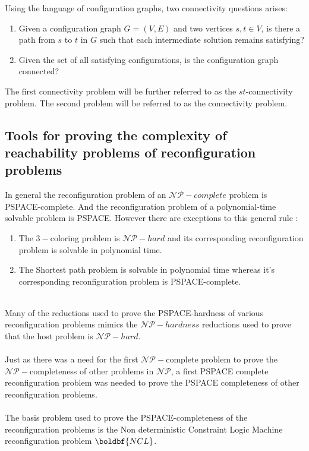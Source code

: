 \begin{defn}Using the language of configuration graphs, two connectivity questions arises: 
\begin{enumerate}
    \item Given a configuration graph $G = (V,E)$ and two vertices $s,t \in V $, is there a path from $s$ to $t$ in $G$ such that each intermediate solution remains satisfying? 
    \item Given the set of all satisfying configurations, is the configuration graph connected? 
\end{enumerate}
The first connectivity problem will be further referred to as the $st$-connectivity problem. The second problem will be referred to as the connectivity problem.
\end{defn}

\subsection{Tools for proving the complexity of reachability problems of reconfiguration problems}
In general the reconfiguration problem of an $\mathcal{NP-}complete$ problem is PSPACE-complete. 
And the reconfiguration problem of a polynomial-time solvable problem is PSPACE. However there are exceptions to this general rule : 
\begin{enumerate}
    \item The $3-$coloring problem is $\mathcal{NP-}hard$ and its corresponding reconfiguration problem is solvable in polynomial time. 
    \item The Shortest path problem is solvable in polynomial time whereas it's corresponding reconfiguration problem is PSPACE-complete.
\end{enumerate}
\\
Many of the reductions used to prove the PSPACE-hardness of various reconfiguration problems mimics the $\mathcal{NP-}hardness$ reductions used to prove that the host problem is $\mathcal{NP-}hard$. \\
\\
Just as there was a need for the first $\mathcal{NP-}$complete problem to prove the $\mathcal{NP-}$completeness of other problems in $\mathcal{NP}$, a first PSPACE complete reconfiguration problem was needed to prove the PSPACE completeness of other reconfiguration problems. \\
\\
The basis problem used to prove the PSPACE-completeness of the reconfiguration problems is the Non deterministic Constraint Logic Machine reconfiguration problem $\boldbf{NCL}$. 

